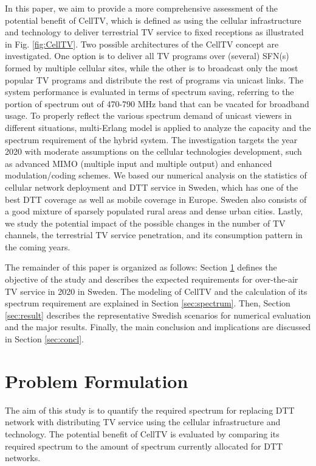 \documentclass[journal]{IEEEtran}
\begin{document}
In this paper, we aim to provide a more comprehensive assessment of the potential benefit of CellTV, which is defined as using the cellular infrastructure and technology to deliver terrestrial TV service to fixed receptions as illustrated in Fig. \ref{fig:CellTV}. Two possible architectures of the CellTV concept are investigated. One option is to deliver all TV programs over (several) SFN(s) formed by multiple cellular sites, while the other is to broadcast only the most popular TV programs and distribute the rest of programs via unicast links. The system performance is evaluated in terms of spectrum saving, referring to the portion of spectrum out of 470-790 MHz band that can be vacated for broadband usage. To properly reflect the various spectrum demand of unicast viewers in different situations, multi-Erlang model is applied to analyze the capacity and the spectrum requirement of the hybrid system. The investigation targets the year 2020 with moderate assumptions on the cellular technologies development, such as advanced MIMO (multiple input and multiple output) and enhanced modulation/coding schemes. We based our numerical analysis on the statistics of cellular network deployment and DTT service in Sweden, which has one of the best DTT coverage as well as mobile coverage in Europe. Sweden also consists of a good mixture of sparsely populated rural areas and dense urban cities. Lastly, we study the potential impact of the possible changes in the number of TV channels, the terrestrial TV service penetration, and its consumption pattern in the coming years.


The remainder of this paper is organized as follows: Section \ref{sec:Problem Formulation} defines the objective of the study and describes the expected requirements for over-the-air TV service in 2020 in Sweden. The modeling of CellTV and the calculation of its spectrum requirement are explained in Section \ref{sec:spectrum}. Then, Section \ref{sec:result} describes the representative Swedish scenarios for numerical evaluation and the major results. Finally, the main conclusion and implications are discussed in Section \ref{sec:concl}.


\section{Problem Formulation}
\label{sec:Problem Formulation}

The aim of this study is to quantify the required spectrum for replacing DTT network with distributing TV service using the cellular infrastructure and technology. The potential benefit of CellTV is evaluated by comparing its required spectrum to the amount of spectrum currently allocated for DTT networks.
\end{document}
